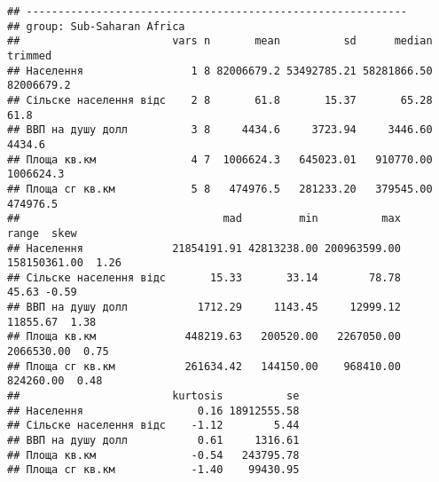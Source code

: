 \documentclass[
]{article}
\begin{document}
\begin{verbatim}
## ------------------------------------------------------------ 
## group: Sub-Saharan Africa
##                        vars n       mean          sd      median    trimmed
## Населення                 1 8 82006679.2 53492785.21 58281866.50 82006679.2
## Сільске населення відс    2 8       61.8       15.37       65.28       61.8
## ВВП на душу долл          3 8     4434.6     3723.94     3446.60     4434.6
## Площа кв.км               4 7  1006624.3   645023.01   910770.00  1006624.3
## Площа сг кв.км            5 8   474976.5   281233.20   379545.00   474976.5
##                                mad         min          max        range  skew
## Населення              21854191.91 42813238.00 200963599.00 158150361.00  1.26
## Сільске населення відс       15.33       33.14        78.78        45.63 -0.59
## ВВП на душу долл           1712.29     1143.45     12999.12     11855.67  1.38
## Площа кв.км              448219.63   200520.00   2267050.00   2066530.00  0.75
## Площа сг кв.км           261634.42   144150.00    968410.00    824260.00  0.48
##                        kurtosis          se
## Населення                  0.16 18912555.58
## Сільске населення відс    -1.12        5.44
## ВВП на душу долл           0.61     1316.61
## Площа кв.км               -0.54   243795.78
## Площа сг кв.км            -1.40    99430.95
\end{verbatim}
\end{document}
